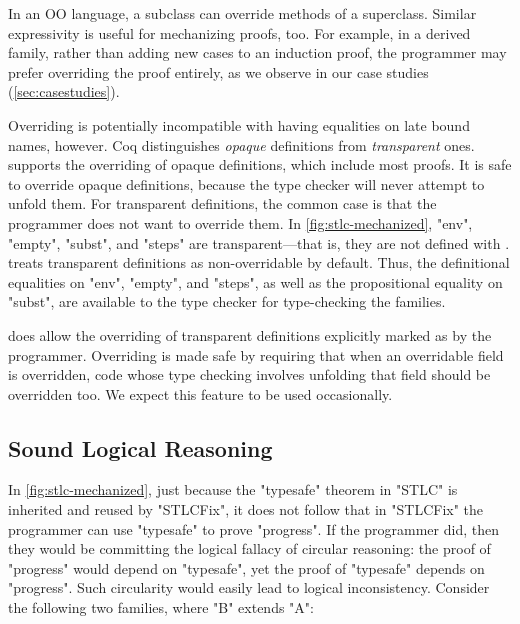 In an OO language, a subclass can override methods of a superclass.
Similar expressivity is useful for mechanizing proofs, too.
%
For example, in a derived family, rather than adding new cases to an
induction proof, the programmer may prefer overriding the proof
entirely, as we observe in our case studies (\cref{sec:casestudies}).

Overriding is potentially incompatible with having equalities on late bound names, however.
%
Coq distinguishes \emph{opaque} definitions from \emph{transparent} ones.
\Lang supports the overriding of opaque definitions, which
include most proofs.
It is safe to override opaque definitions, because the type checker will
never attempt to unfold them.
For transparent definitions, the common case is that the programmer does
not want to override them.
In \cref{fig:stlc-mechanized}, "env", "empty", "subst", and "steps" are
transparent---that is, they are not defined with .
\Lang treats transparent definitions as non-overridable by default.
Thus, the definitional equalities on "env", "empty", and "steps",
as well as the propositional equality on "subst", are available to the
type checker for type-checking the families.

\Lang does allow the overriding of transparent definitions
explicitly marked as  by the programmer.
Overriding is made safe by requiring that when an overridable field is
overridden, code whose type checking involves unfolding that field
should be overridden too.
We expect this feature to be used occasionally.


\subsection{Sound Logical Reasoning}
\label{sec:sound}


In \cref{fig:stlc-mechanized}, just because the "typesafe" theorem in
"STLC" is inherited and reused by "STLCFix", it does not follow that
in "STLCFix" the programmer can use "typesafe" to prove "progress".
If the programmer did, then they would be committing the logical fallacy
of circular reasoning: the proof of "progress" would depend on "typesafe",
yet the proof of "typesafe" depends on "progress".
%
Such circularity would easily lead to logical inconsistency.
Consider the following two families, where "B" extends "A":

